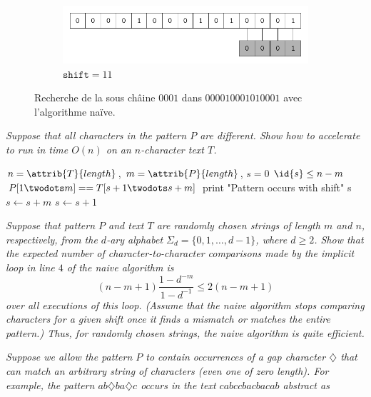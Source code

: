 \begin{description}
\begin{ex}
\begin{figure}[H]
\begin{subfigure}[t]{.45\textwidth}
        \centering
        \includegraphics[scale=.6]{img/32_1-1/32_1-1_12.pdf}
        \caption{$\texttt{shift} = 11$}\label{fig:32_1-1_12}
      \end{subfigure}
      \caption{Recherche de la sous châine $0001$ dans $000010001010001$ avec l'algorithme naïve.} 
      \label{fig:naive-match-string} 
    \end{figure}
\end{ex}


 \textit{Suppose that all characters in the pattern $P$ are different. Show how to accelerate
 to run in time $O(n)$ on an $n$-character text $T$.}

\begin{ex}
\begin{codebox}
    \li $n = \attrib{T}{length}$, $m = \attrib{P}{length}$, $s = 0$
    \li \While $\id{s} \le n -m$ \Do
    \li \If $P[1\twodots m] == T[s + 1\twodots s + m]$ \Then
    \li print "Pattern occurs with shift" s 
    \li $s \gets s + m$ 
    \li \Else 
    \li $s \gets s + 1$ \End
\end{codebox}
\end{ex}

 \textit{Suppose that pattern $P$ and text $T$ are randomly chosen strings of length $m$ and $n$,
respectively, from the $d$-ary alphabet $\Sigma_d = \{0, 1, \ldots, d-1\}$, where $d \ge 2$. Show
that the expected number of character-to-character comparisons made by the implicit loop in line $4$ of the naive algorithm is
    \[(n-m+1) \frac{1-d^{-m}}{1-d^{-1}} \le 2(n - m + 1)\]
over all executions of this loop. (Assume that the naive algorithm stops comparing
characters for a given shift once it finds a mismatch or matches the entire pattern.)
Thus, for randomly chosen strings, the naive algorithm is quite efficient.  }

\begin{exrev}

\end{exrev}

 \textit{Suppose we allow the pattern $P$ to contain occurrences of a gap character $\diamondsuit$ that
can match an \textit{arbitrary} string of characters (even one of zero length). For example,
the pattern $ab\diamondsuit ba\diamondsuit c$ occurs in the text $cabccbacbacab$ abstract as}


\end{description}
